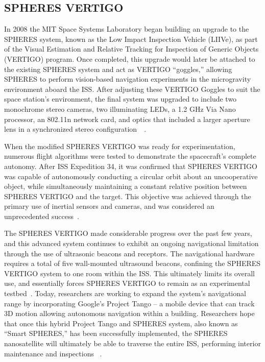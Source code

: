 \documentclass[journal, 10pt]{IEEEtran}
\begin{document}
\subsection{SPHERES VERTIGO}
In 2008 the MIT Space Systems Laboratory began building an upgrade to the SPHERES system, known as the Low Impact Inspection Vehicle (LIIVe), as part of the Visual Estimation and Relative Tracking for Inspection of Generic Objects (VERTIGO) program. Once completed, this upgrade would later be attached to the existing SPHERES system and act as VERTIGO ``goggles,'' allowing SPHERES to perform vision-based navigation experiments in the microgravity environment aboard the ISS. After adjusting these VERTIGO Goggles to suit the space station's environment, the final system was upgraded to include two monochrome stereo cameras, two illuminating LEDs, a 1.2 GHz Via Nano processor, an 802.11n network card, and optics that included a larger aperture lens in a synchronized stereo configuration~~\cite{SPHERES, Vertigo 1, Vertigo2, Vertigo3}.

When the modified SPHERES VERTIGO was ready for experimentation, numerous flight algorithms were tested to demonstrate the spacecraft's complete autonomy. After ISS Expedition 34, it was confirmed that SPHERES VERTIGO was capable of autonomously conducting a circular orbit about an uncooperative object, while simultaneously maintaining a constant relative position between SPHERES VERTIGO and the target. This objective was achieved through the primary use of inertial sensors and cameras, and was considered an unprecedented success~\cite{Vertigo2, Vertigo3}.

The SPHERES VERTIGO made considerable progress over the past few years, and this advanced system continues to exhibit an ongoing navigational limitation through the use of ultrasonic beacons and receptors.  The navigational hardware requires a total of five wall-mounted ultrasound beacons, confining the SPHERES VERTIGO system to one room within the ISS. This ultimately  limits its overall use, and essentially forces SPHERES VERTIGO to remain as an experimental testbed~\cite{SPHERES, Vertigo 1, Vertigo2, Vertigo3}. Today, researchers are working to expand the system's navigational range by incorporating Google's Project Tango -- a mobile device that can track 3D motion allowing autonomous navigation within a building. Researchers hope that once this hybrid Project Tango and SPHERES system, also known as ``Smart SPHERES,'' has been successfully implemented, the SPHERES nanosatellite will ultimately be able to traverse the entire ISS, performing interior maintenance and inspections ~\cite{Tango}.
\end{document}
